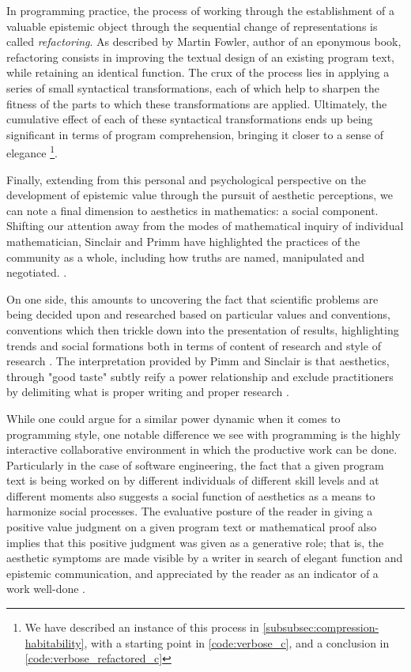In programming practice, the process of working through the establishment of a valuable epistemic object through the sequential change of representations is called \emph{refactoring}. As described by Martin Fowler, author of an eponymous book, refactoring consists in improving the textual design of an existing program text, while retaining an identical function. The crux of the process lies in applying a series of small syntactical transformations, each of which help to sharpen the fitness of the parts to which these transformations are applied. Ultimately, the cumulative effect of each of these syntactical transformations ends up being significant in terms of program comprehension, bringing it closer to a sense of elegance \citep{fowler_refactoring_1999}\footnote{We have described an instance of this process in \ref{subsubsec:compression-habitability}, with a starting point in \ref{code:verbose_c}, and a conclusion in \ref{code:verbose_refactored_c}}.

Finally, extending from this personal and psychological perspective on the development of epistemic value through the pursuit of aesthetic perceptions, we can note a final dimension to aesthetics in mathematics: a social component. Shifting our attention away from the modes of mathematical inquiry of individual mathematician, Sinclair and Primm have highlighted the practices of the community as a whole, including how truths are named, manipulated and negotiated. \citep{sinclair_aesthetic_2011}.

On one side, this amounts to uncovering the fact that scientific problems are being decided upon and researched based on particular values and conventions, conventions which then trickle down into the presentation of results, highlighting trends and social formations both in terms of content of research and style of research \citep{depaz_stylistique_2023}. The interpretation provided by Pimm and Sinclair is that aesthetics, through "good taste" subtly reify a power relationship and exclude practitioners by delimiting what is proper writing and proper research \citep{sinclair_many_2010}.

While one could argue for a similar power dynamic when it comes to programming style, one notable difference we see with programming is the highly interactive collaborative environment in which the productive work can be done. Particularly in the case of software engineering, the fact that a given program text is being worked on by different individuals of different skill levels and at different moments also suggests a social function of aesthetics as a means to harmonize social processes. The evaluative posture of the reader in giving a positive value judgment on a given program text or mathematical proof also implies that this positive judgment was given as a generative role; that is, the aesthetic symptoms are made visible by a writer in search of elegant function and epistemic communication, and appreciated by the reader as an indicator of a work well-done \citep{tomov_role_2016a}.

